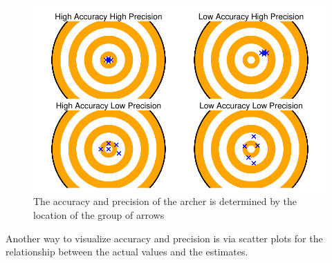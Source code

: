 \documentclass[
  letterpaper,
  DIV=11,
  numbers=noendperiod]{scrreprt}
\begin{document}
\begin{figure}[H]

{\centering \includegraphics{./data-accuracy_files/figure-pdf/fig-target-1.pdf}

}

\caption{\label{fig-target}The accuracy and precision of the archer is
determined by the location of the group of arrows}

\end{figure}

Another way to visualize accuracy and precision is via scatter plots for
the relationship between the actual values and the estimates.
\end{document}
